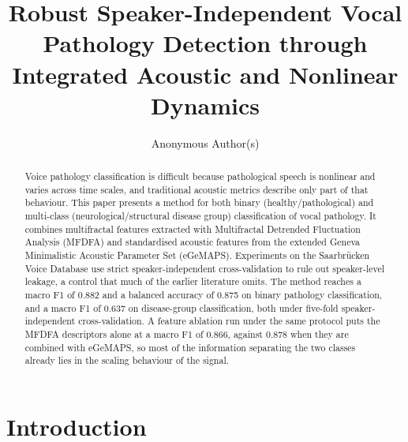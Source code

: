 \documentclass[runningheads]{llncs}
\begin{document}
%
\title{Robust Speaker-Independent Vocal Pathology Detection through Integrated Acoustic and Nonlinear Dynamics}
%
%
\author{Anonymous Author(s)}
%
%
%
\maketitle              %
%
\begin{abstract}
Voice pathology classification is difficult because pathological speech is nonlinear and varies across time scales, and traditional acoustic metrics describe only part of that behaviour. This paper presents a method for both binary (healthy/pathological) and multi-class (neurological/structural disease group) classification of vocal pathology. It combines multifractal features extracted with Multifractal Detrended Fluctuation Analysis (MFDFA) and standardised acoustic features from the extended Geneva Minimalistic Acoustic Parameter Set (eGeMAPS). Experiments on the Saarbrücken Voice Database use strict speaker-independent cross-validation to rule out speaker-level leakage, a control that much of the earlier literature omits. The method reaches a macro F1 of 0.882 and a balanced accuracy of 0.875 on binary pathology classification, and a macro F1 of 0.637 on disease-group classification, both under five-fold speaker-independent cross-validation. A feature ablation run under the same protocol puts the MFDFA descriptors alone at a macro F1 of 0.866, against 0.878 when they are combined with eGeMAPS, so most of the information separating the two classes already lies in the scaling behaviour of the signal.

\end{abstract}
%
%
%
  \section{Introduction}
  \label{sec:introduction}
\end{document}
